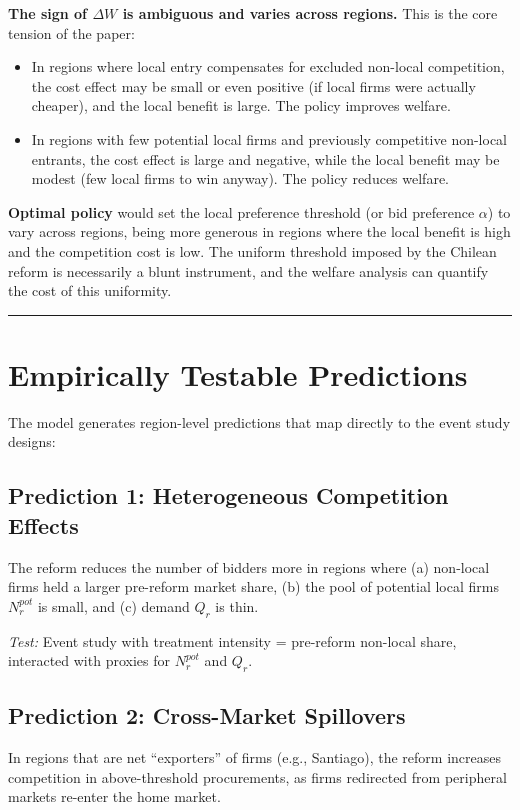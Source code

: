 \documentclass[10pt]{article}
\begin{document}
\noindent\textbf{The sign of $\Delta W$ is ambiguous and varies across regions.} This is the core tension of the paper:

\begin{itemize}
  \item In regions where local entry compensates for excluded non-local competition, the cost effect may be small or even positive (if local firms were actually cheaper), and the local benefit is large. The policy improves welfare.
  \item In regions with few potential local firms and previously competitive non-local entrants, the cost effect is large and negative, while the local benefit may be modest (few local firms to win anyway). The policy reduces welfare.
\end{itemize}

\noindent\textbf{Optimal policy} would set the local preference threshold (or bid preference $\alpha$) to vary across regions, being more generous in regions where the local benefit is high and the competition cost is low. The uniform threshold imposed by the Chilean reform is necessarily a blunt instrument, and the welfare analysis can quantify the cost of this uniformity.

\bigskip\hrule\bigskip

\section{Empirically Testable Predictions}

The model generates region-level predictions that map directly to the event study designs:

\subsection*{Prediction 1: Heterogeneous Competition Effects}
The reform reduces the number of bidders more in regions where (a) non-local firms held a larger pre-reform market share, (b) the pool of potential local firms $N_r^{pot}$ is small, and (c) demand $Q_r$ is thin.

\noindent\emph{Test:} Event study with treatment intensity = pre-reform non-local share, interacted with proxies for $N_r^{pot}$ and $Q_r$.

\subsection*{Prediction 2: Cross-Market Spillovers}
In regions that are net ``exporters'' of firms (e.g., Santiago), the reform increases competition in above-threshold procurements, as firms redirected from peripheral markets re-enter the home market.
\end{document}
